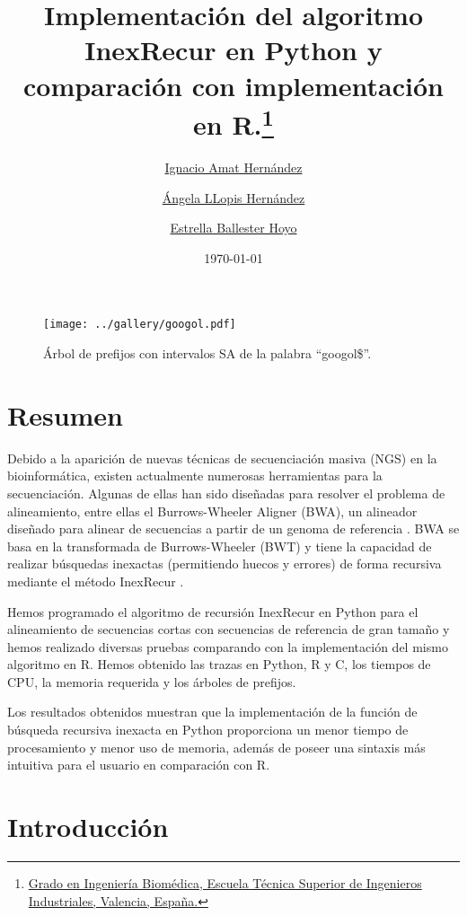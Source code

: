 \documentclass{article}
\title{\textbf{Implementación del algoritmo InexRecur en Python y
comparación con implementación en R.}\thanks{\href{https://www.upv.es/titulaciones/GIB/indexc.html}{Grado en Ingeniería Biomédica, Escuela Técnica Superior de Ingenieros Industriales, Valencia, España.}}}
\date{\today}
\author{
     \href{mailto:igamher@etsid.upv.es}{Ignacio Amat Hernández}
\and \href{mailto:ngellohe@etsii.upv.es}{Ángela LLopis Hernández}
\and \href{mailto:esbalho@etsii.upv.es}{Estrella Ballester Hoyo}
}
\begin{document}
\maketitle
\begin{figure}[h]
\centering
\texttt{[image: ../gallery/googol.pdf]}
\caption{Árbol de prefijos con intervalos SA de la palabra ``googol\$''.}
\label{fig:arbol1}
\end{figure}

\clearpage

\tableofcontents
\listoffigures
\listoftables
\lstlistoflistings

\section*{Resumen}

Debido a la aparición de nuevas técnicas de secuenciación masiva (NGS)
en la bioinformática, existen actualmente numerosas herramientas  para
la secuenciación. Algunas de ellas han sido diseñadas para resolver el
problema de  alineamiento,  entre  ellas  el  Burrows-Wheeler  Aligner
(BWA), un alineador diseñado para alinear de secuencias a partir de un
genoma	de  referencia \cite{gimenez_2016}.   BWA  se	basa   en   la
transformada de Burrows-Wheeler (BWT) y tiene la capacidad de realizar
búsquedas inexactas (permitiendo huecos y errores) de forma  recursiva
mediante el método InexRecur \cite{li_durbin_2009}.

Hemos programado el algoritmo de recursión InexRecur en Python para el
alineamiento de secuencias cortas con secuencias de referencia de gran
tamaño	y  hemos  realizado  diversas  pruebas	 comparando   con   la
implementación del mismo algoritmo en R.  Hemos obtenido las trazas en
Python, R y C, los tiempos de CPU, la memoria requerida y los  árboles
de prefijos.

Los resultados obtenidos muestran que la implementación de la  función
de búsqueda recursiva inexacta en Python proporciona un  menor	tiempo
de procesamiento y menor uso de memoria, además de poseer una sintaxis
más   intuitiva   para	 el   usuario	en    comparación    con    R.

\section{Introducción}
\end{document}
